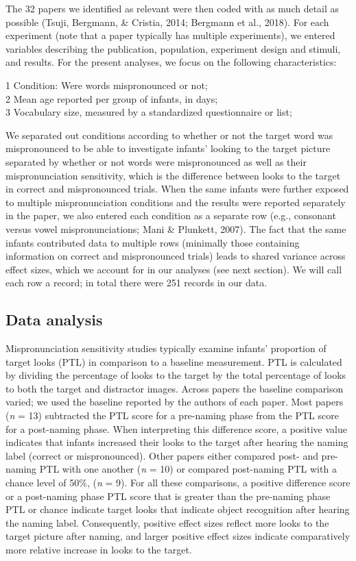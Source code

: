 \documentclass[man]{apa6}
\theoremstyle{definition}
\theoremstyle{definition}
\theoremstyle{definition}
\theoremstyle{remark}
\begin{document}
The 32 papers we identified as relevant were then coded with as much
detail as possible (Tsuji, Bergmann, \& Cristia, 2014; Bergmann et al.,
2018). For each experiment (note that a paper typically has multiple
experiments), we entered variables describing the publication,
population, experiment design and stimuli, and results. For the present
analyses, we focus on the following characteristics:

1 Condition: Were words mispronounced or not;\\
2 Mean age reported per group of infants, in days;\\
3 Vocabulary size, measured by a standardized questionnaire or list;

We separated out conditions according to whether or not the target word
was mispronounced to be able to investigate infants' looking to the
target picture separated by whether or not words were mispronounced as
well as their mispronunciation sensitivity, which is the difference
between looks to the target in correct and mispronounced trials. When
the same infants were further exposed to multiple mispronunciation
conditions and the results were reported separately in the paper, we
also entered each condition as a separate row (e.g., consonant versus
vowel mispronunciations; Mani \& Plunkett, 2007). The fact that the same
infants contributed data to multiple rows (minimally those containing
information on correct and mispronounced trials) leads to shared
variance across effect sizes, which we account for in our analyses (see
next section). We will call each row a record; in total there were 251
records in our data.

\subsection{Data analysis}\label{data-analysis}

Mispronunciation sensitivity studies typically examine infants'
proportion of target looks (PTL) in comparison to a baseline
measurement. PTL is calculated by dividing the percentage of looks to
the target by the total percentage of looks to both the target and
distractor images. Across papers the baseline comparison varied; we used
the baseline reported by the authors of each paper. Most papers
(\emph{n} = 13) subtracted the PTL score for a pre-naming phase from the
PTL score for a post-naming phase. When interpreting this difference
score, a positive value indicates that infants increased their looks to
the target after hearing the naming label (correct or mispronounced).
Other papers either compared post- and pre-naming PTL with one another
(\emph{n} = 10) or compared post-naming PTL with a chance level of 50\%,
(\emph{n} = 9). For all these comparisons, a positive difference score
or a post-naming phase PTL score that is greater than the pre-naming
phase PTL or chance indicate target looks that indicate object
recognition after hearing the naming label. Consequently, positive
effect sizes reflect more looks to the target picture after naming, and
larger positive effect sizes indicate comparatively more relative
increase in looks to the target.
\end{document}
